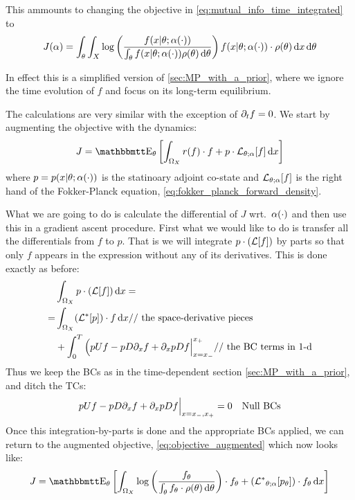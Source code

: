 \documentclass{article}
\begin{document}
This ammounts to changing the objective in
\cref{eq:mutual_info_time_integrated} to  
$$
J({\alpha})  = \int_{\theta} \int_X
 \log\left(\frac{f(x|{\theta} ; {\alpha}(\cdot) )}
 			{\int_{\theta} f(x|{\theta}; {\alpha}(\cdot)) \rho({\theta})\, \mathrm{d} {\theta}}\right) 
 f(x|{\theta}; {\alpha}(\cdot)) \cdot \rho({\theta}) \, \mathrm{d} x\, \mathrm{d} {\theta}
$$

In effect this is a simplified version of \cref{sec:MP_with_a_prior}, where we
ignore the time evolution of $f$ and focus on its long-term equilibrium.

The calculations are very similar with the exception of ${\partial}_t f = 0$. We start
by augmenting the objective with the dynamics:
\begin{equation}
J =  \Exp_\th
\left[ \int_{\O_X} r(f) \cdot f + p \cdot \L_{\th;\a}[f]
\intd{x}\right] 
\label{eq:objective_stat_augmented}
\end{equation} 
where $p =  p(x|{\theta}; {\alpha}(\cdot))$ is the statinoary adjoint co-state and 
${ \mathcal{L} }_{{\theta};{\alpha}}[f]$ is the right hand of the Fokker-Planck equation,
\cref{eq:fokker_planck_forward_density}.

What we are going to do is calculate the differential of $J$ wrt.\ ${\alpha}(\cdot)$
and then use this in a gradient ascent procedure. First what we would like to do
is transfer all the differentials from $f$ to $p$. That is we will integrate $p
\cdot ({ \mathcal{L} }[f])$ by parts so that only $f$ appears in the expression
without any of its derivatives. This is done exactly as before:
\begin{align*}
& \int_{{\Omega}_X} p \cdot ({ \mathcal{L} }[f]) \, \mathrm{d} x=
\\
=& \int_{{\Omega}_X}
	    ({ { \mathcal{L} }^* }[p])\cdot f 
	 \, \mathrm{d} x  \textrm{// the space-derivative pieces }
	  \\
	  &+ \int_0^T 
	   \Big( p U f - p D {\partial}_xf + {\partial}_x p D f \Big|_{x={ x_{-} }}^{{ x_{+} }} 
	   \textrm{// the BC terms in 1-d}
\end{align*}
Thus we keep the BCs as in the time-dependent section
\cref{sec:MP_with_a_prior}, and ditch the TCs:
\begin{align*}
p U f - p D {\partial}_xf + {\partial}_x p D f &\Big|_{x={ x_{-} }, { x_{+} }} = 0 & \textrm{Null BCs}
\end{align*}
Once this integration-by-parts is done and the appropriate BCs applied, we
can return to the augmented objective, \cref{eq:objective_augmented} which now
looks like:
\begin{equation}
J =  \Exp_\th
\left[ \int_{\O_X} \log\left(\frac{f_\th}
 					{\int_\th f_\th \cdot \rho(\th)\intd{\th}}\right) 
 			 \cdot f_\th 
 			 + 
 			 (\Lstar_{\th;\a}[p_\th] ) \cdot f_\th
\intd{x}
\right]
\label{eq:objective_stat_augmented_adjoined}
\end{equation}
\end{document}

